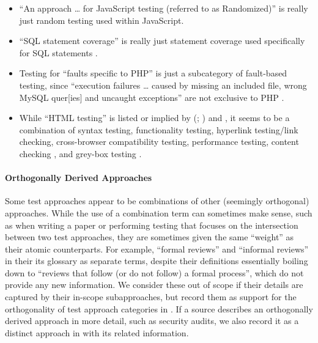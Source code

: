     \begin{itemize}
        \item ``An approach \dots{} for JavaScript testing
              (referred to as Randomized)'' \citep[p.~192]{DoğanEtAl2014} is
              really just random testing used within JavaScript.
        \item ``SQL statement coverage'' is really just statement coverage
              used specifically for SQL statements \citep[Tab.~13]{DoğanEtAl2014}%
              .
        \item Testing for ``faults specific to PHP'' is just a subcategory of
              fault-based testing, since ``execution failures \dots{} caused by
              missing an included file, wrong MySQL quer[ies] and uncaught
              exceptions'' are not exclusive to PHP
              \citep[Tab.~27]{DoğanEtAl2014}.
        \item While ``HTML testing'' is listed or implied by
              \citeauthor{Gerrard2000a} (\citeyear[Tab.~2]{Gerrard2000a};
              \citeyear[Tab.~1, p.~3]{Gerrard2000b}) and
              \citet[p.~220]{Patton2006}, it seems to be a combination of syntax
              testing, functionality testing, hyperlink testing/link checking,
              cross-browser compatibility testing, performance testing,
              content checking \citep[p.~3]{Gerrard2000b}, and grey-box testing
              \citep[pp.~218\==220]{Patton2006}.
    \end{itemize}

    \paragraph{Orthogonally Derived Approaches}
    \label{orth-test}
    Some test approaches appear to be combinations of other (seemingly
    orthogonal) approaches. While the use of a combination term can sometimes
    make sense, such as when writing a paper or performing testing that focuses
    on the intersection between two test approaches, they are sometimes given
    the same ``weight'' as their atomic counterparts. For example, \citetISTQB{}
     ``formal reviews'' and ``informal reviews'' in
    \ifnotpaper their \else its \fi glossary as separate terms, despite their
    definitions essentially boiling down to ``reviews that follow (or do not
    follow) a formal process'', which do not provide any new information.
    We consider these out of scope if their details are captured by their
    in-scope subapproaches, but record them as support for the orthogonality of
    test approach categories in . If a source describes an
    orthogonally derived approach in more detail, such as security audits, we
    also record it as a distinct approach in \ourApproachGlossary{} with its
    related information.

